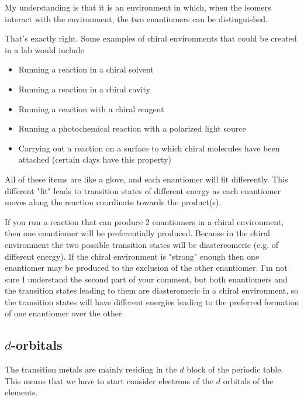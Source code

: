 \documentclass[../mit-general-chemistry.tex]{subfiles}
\begin{document}
\begin{remark}
  My understanding is that it is an environment in which, when the
  isomers interact with the environment, the two enantiomers can be
  distinguished.
  
  That's exactly right. Some examples of chiral environments that
  could be created in a lab would include

  \begin{itemize}
  \item Running a reaction in a chiral solvent
  \item Running a reaction in a chiral cavity
  \item
    Running a reaction with a chiral reagent
  \item
    Running a photochemical reaction with a polarized light source
  \item
    Carrying out a reaction on a surface to which chiral molecules
    have been attached (certain clays have this property)
  \end{itemize}

  All of these items are like a glove, and each enantiomer will fit
  differently. This different "fit" leads to transition states of
  different energy as each enantiomer moves along the reaction
  coordinate towards the product(s).

  	
  If you run a reaction that can produce 2 enantiomers in a chiral
  environment, then one enantiomer will be preferentially
  produced. Because in the chiral environment the two possible
  transition states will be diastereomeric (e.g. of different
  energy). If the chiral environment is "strong" enough then one
  enantiomer may be produced to the exclusion of the other
  enantiomer. I'm not sure I understand the second part of your comment,
  but both enantiomers and the transition states leading to them are
  diasteromeric in a chiral environment, so the transition states will
  have different energies leading to the preferred formation of one
  enantiomer over the other.
\end{remark}








\subsection{$d$-orbitals}



The transition metals are mainly residing in the $d$ block of the
periodic table. This means that we have to start consider electrons of
the $d$ orbitals of the elements.
\end{document}
